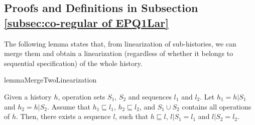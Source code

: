 \subsection{Proofs and Definitions in Subsection \ref{subsec:co-regular of EPQ1Lar}}
\label{sec:appendix proof and definition in section co-regular of EPQ1Lar}

The following lemma states that, from linearization of sub-histories, we can merge them and obtain a linearization (regardless of whether it belongs to sequential specification) of the whole history.

\begin{restatable}{lemma}{MergeTwoLinearization}
\label{lemma:merge two linearization}

Given a history $h$, operation sets $S_1$, $S_2$ and sequences $l_1$ and $l_2$. Let $h_1 = h \vert{S_1}$ and $h_2 = h \vert{S_2}$. Assume that $h_1 \sqsubseteq l_1$, $h_2 \sqsubseteq l_2$, and $S_1 \cup S_2$ contains all operations of $h$. Then, there exists a sequence $l$, such that $h \sqsubseteq l$, $l \vert{S_1} = l_1$ and $l \vert{S_2} = l_2$.
\end{restatable}

